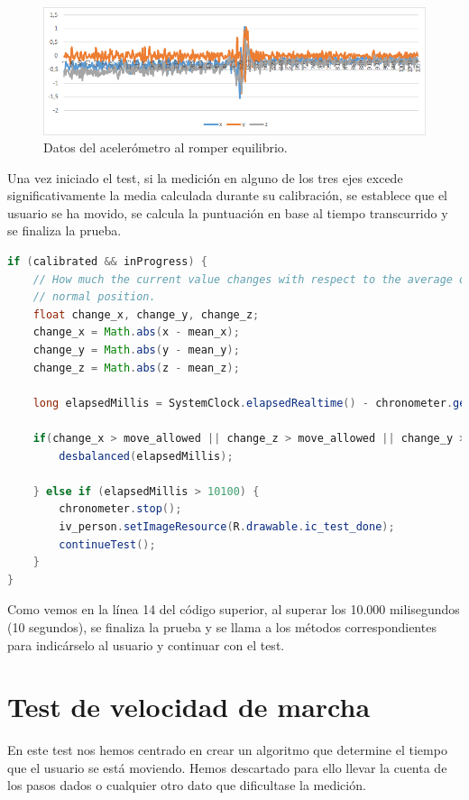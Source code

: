 \begin{figure}[H]
	\centering
	\includegraphics[scale=0.65]{imagenes/grafico_equilibrio.png}
	\caption{Datos del acelerómetro al romper equilibrio.\label{fig:acc_7}}
\end{figure}

Una vez iniciado el test, si la medición en alguno de los tres ejes excede significativamente la media calculada durante su calibración, se establece que el usuario se ha movido, se calcula la puntuación en base al tiempo transcurrido y se finaliza la prueba.

\begin{lstlisting}[language=Java]
if (calibrated && inProgress) {
    // How much the current value changes with respect to the average or
    // normal position.
    float change_x, change_y, change_z;
    change_x = Math.abs(x - mean_x);
    change_y = Math.abs(y - mean_y);
    change_z = Math.abs(z - mean_z);

    long elapsedMillis = SystemClock.elapsedRealtime() - chronometer.getBase();

    if(change_x > move_allowed || change_z > move_allowed || change_y > 1) {
        desbalanced(elapsedMillis);

    } else if (elapsedMillis > 10100) {
        chronometer.stop();
        iv_person.setImageResource(R.drawable.ic_test_done);
        continueTest();
    }
}
\end{lstlisting}

Como vemos en la línea 14 del código superior, al superar los 10.000 milisegundos (10 segundos), se finaliza la prueba y se llama a los métodos correspondientes para indicárselo al usuario y continuar con el test.

\section{Test de velocidad de marcha}

En este test nos hemos centrado en crear un algoritmo que determine el tiempo que el usuario se está moviendo. Hemos descartado para ello llevar la cuenta de los pasos dados o cualquier otro dato que dificultase la medición.

